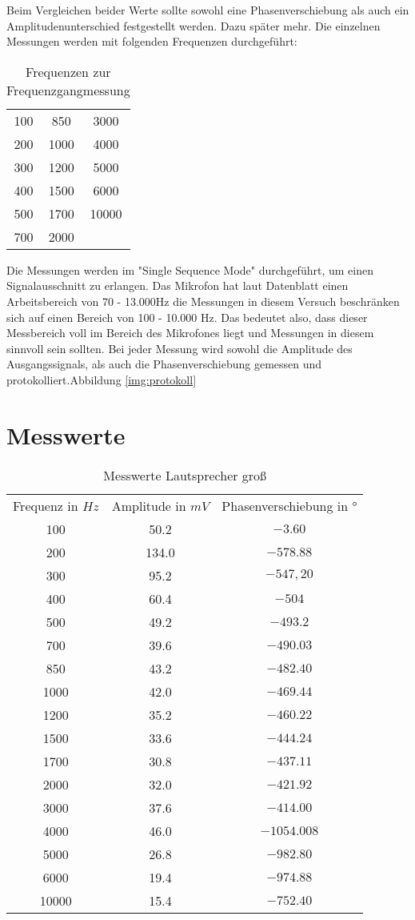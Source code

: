 Beim Vergleichen beider Werte sollte sowohl eine Phasenverschiebung als auch ein Amplitudenunterschied festgestellt werden. Dazu später mehr.
Die einzelnen Messungen werden mit folgenden Frequenzen durchgeführt: 
\begin{table}
\begin{tabular}{|c|c|c|}
100 & 850  & 3000 \\
200 & 1000 & 4000 \\
300 & 1200 & 5000 \\
400 & 1500 & 6000 \\
500 & 1700 & 10000 \\
700 & 2000 & \\
\end{tabular}
\centering
\label{tab:Frequences}
\caption{Frequenzen zur Frequenzgangmessung}
\end{table}
Die Messungen werden im "Single Sequence Mode" durchgeführt, um einen Signalausschnitt zu erlangen. Das Mikrofon hat laut Datenblatt einen Arbeitsbereich von 70 - 13.000Hz die Messungen in diesem Versuch beschränken sich auf einen Bereich von 100 - 10.000 Hz. Das bedeutet also, dass dieser Messbereich voll im Bereich des Mikrofones liegt und Messungen in diesem sinnvoll sein sollten.
Bei jeder Messung wird sowohl die Amplitude des Ausgangssignals, als auch die Phasenverschiebung gemessen und protokolliert.Abbildung \ref{img:protokoll}
\label{chap:VERSUCH_2_FRAGESTELLUNG}

\section{Messwerte}
\label{chap:VERSUCH_2_MESSWERTE}
\begin{table}[H]
\centering
\begin{tabular}{ccc}
  Frequenz in $Hz$ & Amplitude in $mV$ &  Phasenverschiebung in $°$ \\
  100 & 50.2 & $-3.60$ \\
  200 & 134.0 & $-578.88$ \\
  300 & 95.2 & $-547,20$ \\
  400 & 60.4 & $-504$ \\
  500 & 49.2 & $-493.2$ \\
  700 & 39.6 & $-490.03$ \\
  850 & 43.2 & $-482.40$ \\
  1000 & 42.0 & $-469.44$ \\
  1200 & 35.2 & $-460.22$ \\
  1500 & 33.6 & $-444.24$ \\
  1700 & 30.8 & $-437.11$ \\
  2000 & 32.0 & $-421.92$ \\
  3000 & 37.6 & $-414.00$ \\
  4000 & 46.0 & $-1054.008$ \\
  5000 & 26.8 & $-982.80$ \\
  6000 & 19.4 & $-974.88$ \\
  10000 & 15.4 & $-752.40$ \\
 \end{tabular}
\label{tab:MLg}
\caption{Messwerte Lautsprecher groß}
\end{table}

